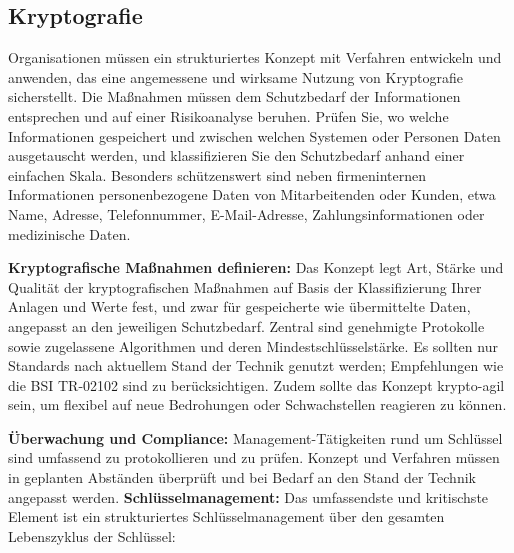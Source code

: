 \newpage
\subsection{Kryptografie}
Organisationen müssen ein strukturiertes Konzept mit Verfahren entwickeln und anwenden, das eine angemessene und wirksame Nutzung von Kryptografie sicherstellt. Die Maßnahmen müssen dem Schutzbedarf der Informationen entsprechen und auf einer Risikoanalyse beruhen. Prüfen Sie, wo welche Informationen gespeichert und zwischen welchen Systemen oder Personen Daten ausgetauscht werden, und klassifizieren Sie den Schutzbedarf anhand einer einfachen Skala. Besonders schützenswert sind neben firmeninternen Informationen personenbezogene Daten von Mitarbeitenden oder Kunden, etwa Name, Adresse, Telefonnummer, E-Mail-Adresse, Zahlungsinformationen oder medizinische Daten.

\textbf{Kryptografische Maßnahmen definieren:} Das Konzept legt Art, Stärke und Qualität der kryptografischen Maßnahmen auf Basis der Klassifizierung Ihrer Anlagen und Werte fest, und zwar für gespeicherte wie übermittelte Daten, angepasst an den jeweiligen Schutzbedarf. Zentral sind genehmigte Protokolle sowie zugelassene Algorithmen und deren Mindestschlüsselstärke. Es sollten nur Standards nach aktuellem Stand der Technik genutzt werden; Empfehlungen wie die BSI TR-02102 sind zu berücksichtigen. Zudem sollte das Konzept krypto-agil sein, um flexibel auf neue Bedrohungen oder Schwachstellen reagieren zu können.

\textbf{Überwachung und Compliance:} Management-Tätigkeiten rund um Schlüssel sind umfassend zu protokollieren und zu prüfen. Konzept und Verfahren müssen in geplanten Abständen überprüft und bei Bedarf an den Stand der Technik angepasst werden.
\newpage
\textbf{Schlüsselmanagement:} Das umfassendste und kritischste Element ist ein strukturiertes Schlüsselmanagement über den gesamten Lebenszyklus der Schlüssel:

